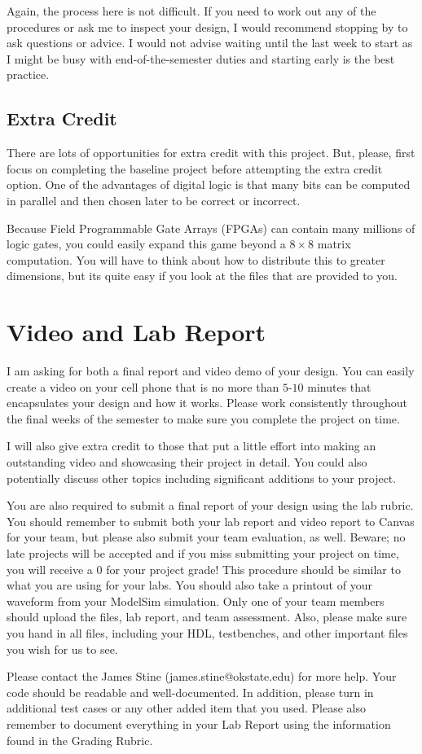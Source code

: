 \documentclass{article}
\begin{document}
Again, the process here is not difficult.  If you need to work out any
of the procedures or ask me to inspect your design, I would recommend
stopping by to ask questions or advice.  I would not advise waiting
until the last week to start as I might be busy with
end-of-the-semester duties and starting early is the best practice.

\subsection{Extra Credit}

There are lots of opportunities for extra credit with this project.
But, please, first focus on completing the baseline project before
attempting the extra credit option.  One of the advantages of digital
logic is that many bits can be computed in parallel and then chosen
later to be correct or incorrect.

Because Field Programmable Gate Arrays
(FPGAs) can contain many millions of logic gates, you could
easily expand this game beyond a $8 \times 8$ matrix computation.  You
will have to think about how to distribute this to greater dimensions,
but its quite easy if you look at the files that are provided to you.

\section{Video and Lab Report}

I am asking for
both a final report and video demo of your design.  You can easily
create a video on your cell phone that is no more than $5$-$10$ minutes
that encapsulates your design and how it works.  Please work
consistently throughout the final weeks of the semester to make sure
you complete the project on time.

I will also give extra credit to those that put a little effort into
making an outstanding video and showcasing their project in detail.
You could also potentially discuss other topics including significant
additions to your project.

You are also required to submit a final report of your design using
the lab rubric.  You should remember to submit both your lab report
and video report to Canvas for
your team, but please also submit your team evaluation, as well.
Beware; no
late projects will be accepted and if you miss submitting your project
on time, you will receive a $0$ for your project grade!  This
procedure should be similar to what you are using for your labs.
You should also take a printout of your waveform 
from your ModelSim simulation.  
Only one of your team members should upload
the files, lab report, and team assessment.  Also, please make sure you
hand in all files, including your HDL, testbenches, and other
important files you wish for us to see.

Please contact
the James Stine
(james.stine@okstate.edu) 
for more help.  Your
code should be
readable and well-documented. In addition, please turn in additional
test cases or any other added item that you used. 
Please also remember to document everything in your Lab Report using
the information found in the Grading Rubric.

   


\end{document}

